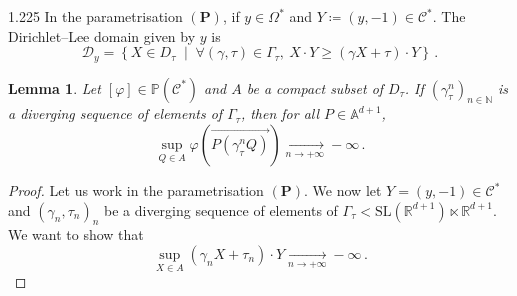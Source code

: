 \documentclass[reqno, a4paper]{amsart}
\numberwithin{equation}{section}
\numberwithin{figure}{section}
\newtheorem{lemma}[theorem]{Lemma}
\theoremstyle{definition}
\theoremstyle{remark}
\newcommand{\R}{\mathbb{R}} %
\newcommand{\N}{\mathbb{N}} %
\newcommand{\A}{\mathbb{A}} %
\renewcommand{\P}{\mathbb{P}} %
\newcommand{\SL}{\mathrm{SL}} %
\newcommand{\C}{\mathcal{C}} %
\newcommand{\DL}{\mathcal{D}} %
\newcommand{\st}{\; \middle\vert \;} %
\newcommand{\vp}[1]{{\left( {#1} \right)}} %
\begin{document}
\begin{spacing}{1.225}
In the parametrisation $(\mathbf{P})$, if $y\in \Omega^*$ and $Y\coloneqq (y,-1) \in \C^*$. The Dirichlet--Lee domain given by $y$ is 
\begin{equation*}
 \DL_{y} = \left\lbrace X \in D_\tau \st \forall (\gamma,\tau) \in \Gamma_\tau, \ X\cdot Y \geq (\gamma X + \tau ) \cdot Y\right\rbrace \, . 
\end{equation*}

\begin{lemma}
\label{lem scalar product to - infty}
Let $[\varphi] \in \P(\C^*)$ and $A$ be a compact subset of $D_\tau$. If $(\gamma^n_\tau)_{n\in \N}$ is a diverging sequence of elements of $\Gamma_\tau$, then for all $P \in \A^{d+1}$,
\begin{equation*}
 \sup_{Q \in A} \varphi\vp{ \overrightarrow{P(\gamma^n_\tau Q)}} \xrightarrow[n \to +\infty]{} -\infty \, . 
\end{equation*}
\end{lemma}
\begin{proof}
Let us work in the parametrisation $(\mathbf{P})$. We now let $Y=(y,-1) \in \C^*$ and $(\gamma_n, \tau_n)_n$ be a diverging sequence of elements of $\Gamma_\tau < \SL(\R^{d+1}) \ltimes \R^{d+1}$. We want to show that
\begin{equation*}
 \sup_{X \in A} (\gamma_n X + \tau_n)\cdot Y \xrightarrow[n \to +\infty]{} -\infty \, . 
\end{equation*}


\end{proof}
\end{spacing}
\end{document}
